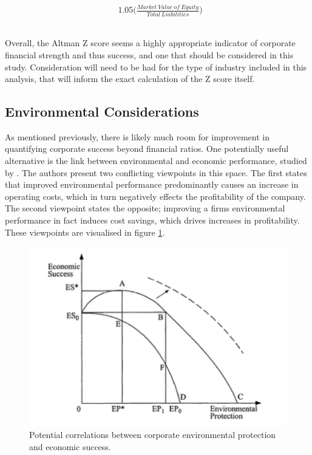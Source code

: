 {\begin {equation}
\begin{aligned}
		& 1.05\bigg({\frac{Market \ Value \ of \ Equity}{Total \ Liabilities}}\bigg) \ \\\\ 
\end{aligned}
\end{equation}\\
Overall, the Altman Z score seems a highly appropriate indicator of corporate financial strength and thus success, and one that should be considered in this study. Consideration will need to be had for the type of industry included in this analysis, that will inform the exact calculation of the Z score itself. }
\subsection{Environmental Considerations}
{As mentioned previously, there is likely much room for improvement in quantifying corporate success beyond financial ratios. One potentially useful alternative is the link between environmental and economic performance, studied by \cite{schaltegger2002link}. The authors present two conflicting viewpoints in this space. The first states that improved environmental performance predominantly causes an increase in operating costs, which in turn negatively effects the profitability of the company. The second viewpoint states the opposite; improving a firms environmental performance in fact induces cost savings, which drives increases in profitability. These viewpoints are visualised in figure \ref{ch3_successAndEnviornment}. 
\begin{figure}[h] 
\centering
\includegraphics[scale = 0.7]{images/ch3_successAndEnviornment.png}
\caption{Potential correlations between corporate environmental protection and economic success.}
\label{ch3_successAndEnviornment}

\end{figure}}
